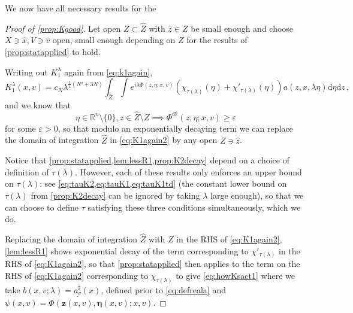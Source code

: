 \documentclass[
	fontsize=11pt, 
	twoside=false, 
	abstract=true, 
	a4paper,
]{scrartcl}
\newcommand{\eps}{\varepsilon}
\newcommand{\sem}{\setminus\{0\}}
\newcommand{\RR}{\mathbb{R}}
\newcommand{\dd}{\mathrm{d}}
\newcommand{\abs}[1]{\left\lvert#1\right\rvert}
\newcommand{\ud}[1]{\underline{#1}}
\begin{document}
We now have all necessary results for the
\begin{proof}[Proof of \cref{prop:Kgood}]
	Let open $Z \subset \hat Z$ with $\hat z \in Z$ be small enough and choose $X \ni \hat x,V \ni \hat v$ open, small enough depending on $Z$ for the results of \cref{prop:statapplied} to hold.%

	Writing out $K_1^\lambda$ again from \cref{eq:k1again}, 
	\begin{equation}\label{eq:K1again2}
		K_1^\lambda(x,v) = c_{N}\lambda^{\frac{1}{4}(N'+3N)}\int_{\hat Z}\int e^{i\lambda\Phi(z,\eta;x,v)}(\chi_{\tau(\lambda)}(\eta) + \chi'_{\tau(\lambda)}(\eta))a(z,x,\lambda\eta)\dd\eta\dd z\,,
	\end{equation}
	and we know that
	\[
		\eta\in\RR^n\sem, z\in \hat Z\setminus Z\implies \Phi^{i\RR}(z,\eta;x,v) \geq \eps
	\]
	for some $\eps > 0$, so that modulo an exponentially decaying term we can replace the domain of integration $\hat Z$ in \cref{eq:K1again2} by any open $Z\ni \hat z$. 

	Notice that \cref{prop:statapplied,lem:lessR1,prop:K2decay} depend on a choice of definition of $\tau(\lambda)$. However, each of these results only enforces an upper bound on $\tau(\lambda)$: see \cref{eq:tauK2,eq:tauK1,eq:tauK1td} (the constant lower bound on $\tau(\lambda)$ from \cref{prop:K2decay} can be ignored by taking $\lambda$ large enough), so that we can choose to define $\tau$ satisfying these three conditions simultaneously, which we do.

	Replacing the domain of integration $\hat Z$ with $Z$ in the RHS of \cref{eq:K1again2}, \cref{lem:lessR1} shows exponential decay of the term corresponding to $\chi'_{\tau(\lambda)}$ in the RHS of \cref{eq:K1again2}, so that \cref{prop:statapplied} then applies to the term on the RHS of \cref{eq:K1again2} corresponding to $\chi_{\tau(\lambda)}$ to give \cref{eq:howKsact1} where we take $b(x,v;\lambda) = \ud{a^\sharp_v}(x)$, defined prior to \cref{eq:defreala} and $\psi(x,v) = \Phi(\mathbf{z}(x,v),\bm{\eta}(x,v);x,v)$. 


\end{proof}
\end{document}
